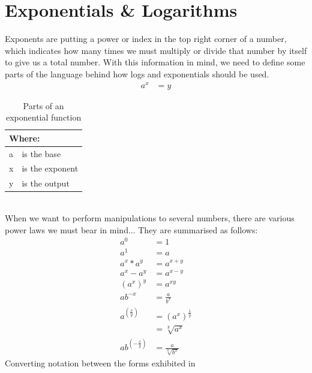 \section{Exponentials \& Logarithms} \label{sec:ExponentialsAndLogarithms}
Exponents are putting a power or index in the top right corner of a number,
which indicates how many times we must multiply or divide that number by
itself to give us a total number. With this information in mind, we need to
define some parts of the language  behind how logs and exponentials should be
used.
\begin{align}
  {a}^{x} & = y
  \label{eq:ExponentialForm}
\end{align}
\begin{table}[!hbt]
\label{tab:PartsOfAnExponential}
\begin{tabularx}{\linewidth}{| l X |}
\hline
\multicolumn{2}{|l|}{Where:} \\
\hline \hline
a & is the base\\
x & is the exponent\\
y & is the output\\
\hline
\end{tabularx}
\caption{Parts of an exponential function}
\end{table}
\\
When we want to perform manipulations to several numbers, there are various
power laws we must bear in mind... They are summarised as follows:
\begin{align}
  {a}^{0}               & = 1 \label{eq:ExponentLaw_Power0} \\
  {a}^{1}               & = a \label{eq:ExponentLaw_Power1} \\
  {a}^{x} * {a}^{y}     & = {a}^{x+y} \label{eq:ExponentLaw_AddExps} \\
  {a}^{x} - {a}^{y}     & = {a}^{x-y} \label{eq:ExponentLaw_SubExps} \\
  {({a}^{x})}^{y}       & = {a}^{xy} \label{eq:ExponentLaw_MultExps} \\
  a{b}^{-x}             & = \frac{a}{{b}^{x}} \label{eq:ExponentLaw_NegExp} \\
  {a}^{(\frac{x}{y})}   & = {({a}^{x})}^{\frac{1}{y}}
                            \label{eq:ExponentLaw_FracExp0} \\
                        & = \sqrt[y]{{a}^{x}} \label{eq:ExponentLaw_FracExp1}\\
  a{b}^{(-\frac{x}{y})} & = \frac{a}{\sqrt[y]{{b}^{x}}}
\end{align}
Converting notation between the forms exhibited in
